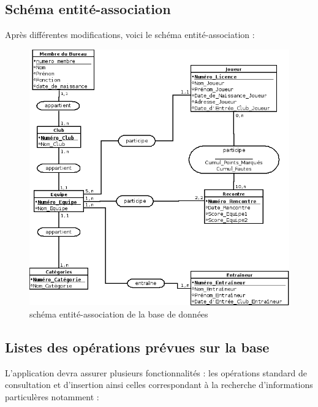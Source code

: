 \documentclass{article}
\begin{document}
\newpage

\subsection{Schéma entité-association }
Après différentes modifications, voici le schéma entité-association :
 
\begin{figure}[h!]
\begin{narrow}{-0.3in}{0in}
\includegraphics[scale=0.74]{BasketBall_EA.png}
\caption{schéma entité-association de la base de données}
\end{narrow}
\end{figure}


\newpage
\subsection {Listes des opérations prévues sur la base}

L’application devra assurer plusieurs fonctionnalités : les opérations standard de consultation et d’insertion ainsi celles correspondant à la recherche d’informations particulères notamment : \\
\end{document}
